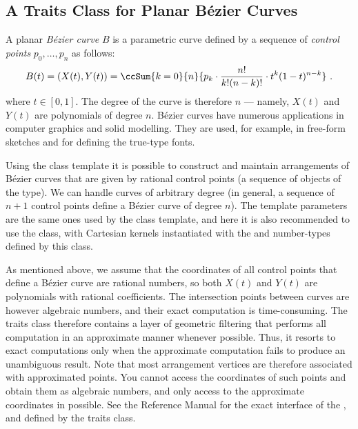 
\subsection{A Traits Class for Planar B\'ezier Curves\label{arr_ssec:tr_bez}}

A planar {\em B\'ezier curve} $B$ is a parametric curve defined by a sequence
of {\em control points} $p_0, \ldots, p_n$ as follows:
\begin{eqnarray*}
B(t) = \left(X(t), Y(t)\right)
  = \ccSum{k=0}{n}{p_k \cdot \frac{n!}{k! (n-k)!} \cdot
                   t^k (1-t)^{n-k}}\ .
\end{eqnarray*}
where $t \in [0, 1]$. The degree of the curve is therefore $n$ ---
namely, $X(t)$ and $Y(t)$ are polynomials of degree $n$. B\'ezier curves
have numerous applications in computer graphics and solid modelling. They
are used, for example, in free-form sketches and for defining the true-type
fonts.

Using the 
class template it is possible to construct and maintain arrangements of
B\'ezier curves that are given by rational control points (a sequence
of objects of the  type). We can handle curves
of arbitrary degree (in general, a sequence of $n+1$ control points define a 
B\'ezier curve of degree $n$). The template parameters are the same ones
used by the  class template, and here it is also
recommended to use the  class, with
Cartesian kernels instantiated with the  and 
number-types defined by this class.

As mentioned above, we assume that the coordinates of all control
points that define a B\'ezier curve are rational numbers, so both $X(t)$
and $Y(t)$ are polynomials with rational coefficients. The intersection
points between curves are however algebraic numbers, and their exact
computation is time-consuming. The traits class therefore contains a layer
of geometric filtering that performs all computation in an approximate
manner whenever possible. Thus, it resorts to exact computations only when
the approximate computation fails to produce an unambiguous result.
Note that most arrangement vertices are therefore associated with approximated
points. You cannot access the coordinates of such points and obtain them as
algebraic numbers, and only access to the approximate coordinates in possible.
See the Reference Manual for the exact interface of the ,
 and  defined by the traits class.

